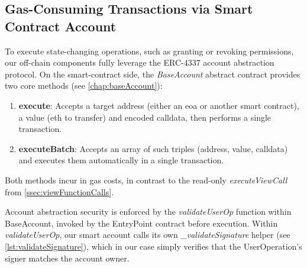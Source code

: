 \subsection{Gas-Consuming Transactions via Smart Contract Account}
To execute state-changing operations, such as granting or revoking permissions, our off-chain components fully leverage the ERC-4337 account abstraction protocol. On the smart-contract side, the \textit{BaseAccount} abstract contract provides two core methods (see \cref{chap:baseAccount}):
\begin{enumerate}
    \item \textbf{execute}: Accepts a target address (either an \acrshort{eoa} or another smart contract), a value (\acrshort{eth} to transfer) and encoded calldata, then performs a single transaction.
    \item \textbf{executeBatch}: Accepts an array of such triples (address, value, calldata) and executes them automatically in a single transaction.
\end{enumerate}
Both methods incur in gas costs, in contrast to the read-only \textit{executeViewCall} from \cref{ssec:viewFunctionCalls}.

Account abstraction security is enforced by the \textit{validateUserOp} function within BaseAccount, invoked by the EntryPoint contract before execution. Within \textit{validateUserOp}, our smart account calls its own \textit{\_validateSignature} helper (see \cref{lst:validateSignature}),  which in our case simply verifies that the UserOperation’s signer matches the account owner.


